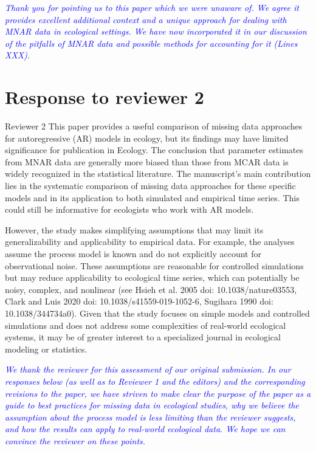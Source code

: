 \documentclass{article}
\begin{document}
\begin{linenumbers}
\noindent \textcolor{blue}{\textit{Thank you for pointing us to this paper which we were unaware of. We agree it provides excellent additional context and a unique approach for dealing with MNAR data in ecological settings. We have now incorporated it in our discussion of the pitfalls of MNAR data and possible methods for accounting for it (Lines XXX).}} 

\section{Response to reviewer 2}

Reviewer 2
This paper provides a useful comparison of missing data approaches for autoregressive (AR) models in ecology, but its findings may have limited significance for publication in Ecology. The conclusion that parameter estimates from MNAR data are generally more biased than those from MCAR data is widely recognized in the statistical literature. The manuscript’s main contribution lies in the systematic comparison of missing data approaches for these specific models and in its application to both simulated and empirical time series. This could still be informative for ecologists who work with AR models.

However, the study makes simplifying assumptions that may limit its generalizability and applicability to empirical data. For example, the analyses assume the process model is known and do not explicitly account for observational noise. These assumptions are reasonable for controlled simulations but may reduce applicability to ecological time series, which can potentially be noisy, complex, and nonlinear (see Hsieh et al. 2005 doi: 10.1038/nature03553, Clark and Luis 2020 doi: 10.1038/s41559-019-1052-6, Sugihara 1990 doi: 10.1038/344734a0). Given that the study focuses on simple models and controlled simulations and does not address some complexities of real-world ecological systems, it may be of greater interest to a specialized journal in ecological modeling or statistics.

\noindent \textcolor{blue}{\textit{We thank the reviewer for this assessment of our original submission. In our responses below (as well as to Reviewer 1 and the editors) and the corresponding revisions to the paper, we have striven to make clear the purpose of the paper as a guide to best practices for missing data in ecological studies, why we believe the assumption about the process model is less limiting than the reviewer suggests, and how the results can apply to real-world ecological data. We hope we can convince the reviewer on these points.}}


\end{linenumbers}
\end{document}
